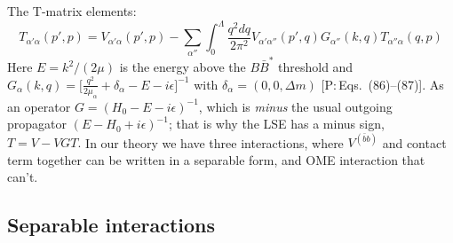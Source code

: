 \documentclass[11pt,a4paper]{article}
\newcommand{\tagP}[1]{\textcolor{blue!65!black}{\textsf{\small[P:\,#1]}}}
\renewcommand{\VQQ}{V^{(\bar bb)}}
\newcommand{\ai}[1]{\textcolor{aicolor}{#1}}
\newcommand{\ai}[1]{#1}
\begin{document}
The T-matrix elements:
\[
	T_{\alpha'\alpha}(p',p) = V_{\alpha'\alpha}(p',p) - \sum_{\alpha''}\int_0^\Lambda \frac{q^2dq}{2\pi^2}V_{\alpha'\alpha''}(p',q)G_{\alpha''}(k,q)T_{\alpha''\alpha}(q,p)
\]
\ai{Here $E=k^2/(2\mu)$ is the energy above the $B\bar B^*$ threshold and $G_\alpha(k,q)=\big[\frac{q^2}{2\mu_\alpha}+\delta_\alpha-E-i\epsilon\big]^{-1}$ with $\delta_\alpha=(0,0,\Delta m)$ \tagP{Eqs.~(86)--(87)}. As an operator $G=(H_0-E-i\epsilon)^{-1}$, which is \emph{minus} the usual outgoing propagator $(E-H_0+i\epsilon)^{-1}$; that is why the LSE has a minus sign, $T=V-VGT$.}
In our theory we have three interactions, where $\VQQ$ and contact term together can be written in a separable form, and OME interaction that can't.

\subsection{Separable interactions}
\end{document}
